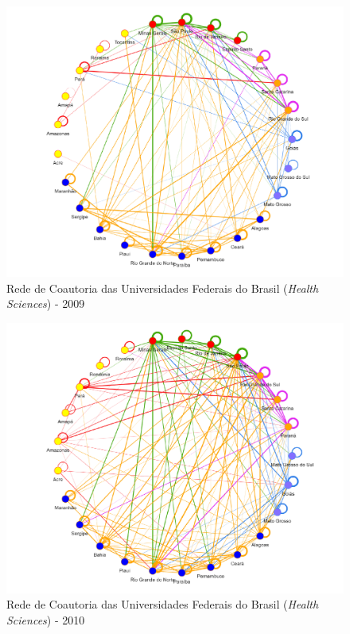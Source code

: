 \begin{figure}[H]
	\centering
	\includegraphics[scale=0.6]{Imagens/rede-2009.pdf}
	\caption{Rede de Coautoria das Universidades Federais do Brasil (\textit{Health Sciences}) - 2009}
	\label{Rede de Coautoria - UF BR 2009}
\end{figure}

\begin{figure}[H]
	\centering
	\includegraphics[scale=0.6]{Imagens/rede-2010.pdf}
	\caption{Rede de Coautoria das Universidades Federais do Brasil (\textit{Health Sciences}) - 2010}
	\label{Rede de Coautoria - UF BR 2010}
\end{figure}

